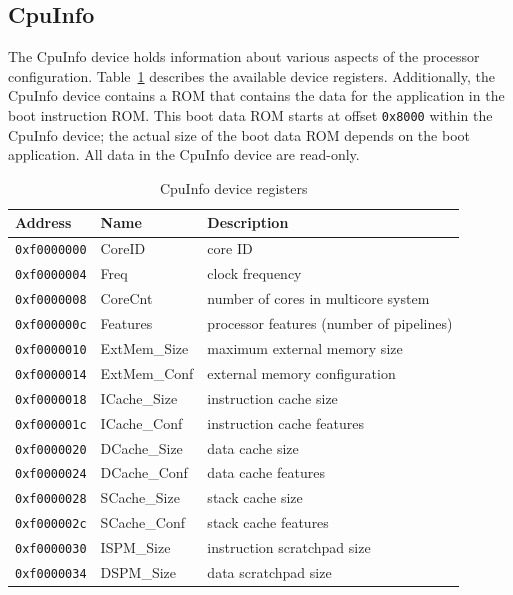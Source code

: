 \documentclass[a4paper,fontsize=10pt,twoside,DIV15,BCOR12mm,headinclude=true,footinclude=false,pagesize,bibtotoc]{scrbook}
\newcommand{\code}[1]{{\texttt{#1}}}
\begin{document}
\subsection{CpuInfo}
\label{sec:cpuinfo}

The CpuInfo device holds information about various aspects of the
processor configuration. Table~\ref{tab:cpuinfo} describes the
available device registers. Additionally, the CpuInfo device contains
a ROM that contains the data for the application in the boot
instruction ROM. This boot data ROM starts at offset \code{0x8000}
within the CpuInfo device; the actual size of the boot data ROM
depends on the boot application. All data in the CpuInfo device are
read-only.

\begin{table}
\centering
\begin{tabular}{lll}
\toprule
Address & Name & Description \\
\midrule
\code{0xf0000000} & CoreID       & core ID \\
\code{0xf0000004} & Freq         & clock frequency \\
\code{0xf0000008} & CoreCnt      & number of cores in multicore system \\
\code{0xf000000c} & Features     & processor features (number of pipelines) \\
\code{0xf0000010} & ExtMem\_Size & maximum external memory size \\
\code{0xf0000014} & ExtMem\_Conf & external memory configuration  \\
\code{0xf0000018} & ICache\_Size & instruction cache size \\
\code{0xf000001c} & ICache\_Conf & instruction cache features \\
\code{0xf0000020} & DCache\_Size & data cache size \\
\code{0xf0000024} & DCache\_Conf & data cache features \\
\code{0xf0000028} & SCache\_Size & stack cache size \\
\code{0xf000002c} & SCache\_Conf & stack cache features \\
\code{0xf0000030} & ISPM\_Size   & instruction scratchpad size \\
\code{0xf0000034} & DSPM\_Size   & data scratchpad size \\
\bottomrule
\end{tabular}
\caption{CpuInfo device registers}
\label{tab:cpuinfo}
\end{table}
\end{document}
